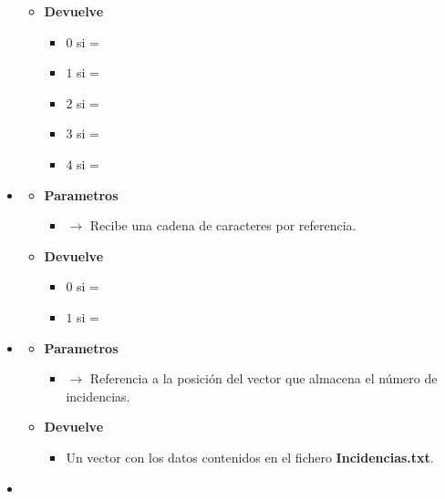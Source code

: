 \begin{itemize}
\begin{itemize}
\begin{itemize}
		\end{itemize}
		\item \textbf{Devuelve}
		\begin{itemize}
			\item $0$ si  = 
			\item $1$ si  = 
			\item $2$ si  = 
			\item $3$ si  = 
			\item $4$ si  = 
		\end{itemize}
	\end{itemize}
	\item\label{def:idavuelta}
	\begin{itemize}
		\item \textbf{Parametros}
		\begin{itemize}
			\item {} $\rightarrow$ Recibe una cadena de caracteres por referencia.
		\end{itemize}
		\item \textbf{Devuelve}
		\begin{itemize}
			\item $0$ si  = 
			\item $1$ si  = 
		\end{itemize}
	\end{itemize}
	\item\label{def:initincidencias}
	\begin{itemize}
		\item \textbf{Parametros}
		\begin{itemize}
			\item {} $\rightarrow$ Referencia a la posición del vector que almacena el número de incidencias.
		\end{itemize}
		\item \textbf{Devuelve}
		\begin{itemize}
			\item Un vector con los datos contenidos en el fichero \textbf{Incidencias.txt}.
		\end{itemize}
	\end{itemize}
	\item\label{def:initpasos}
	\begin{itemize}

\end{itemize}
\end{itemize}

